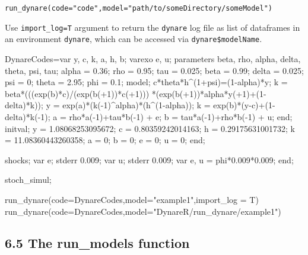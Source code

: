 \documentclass[
  letterpaper,
  DIV=11,
  numbers=noendperiod]{scrartcl}
\newenvironment{Shaded}{\begin{snugshade}}{\end{snugshade}}
\newcommand{\AttributeTok}[1]{\textcolor[rgb]{0.40,0.45,0.13}{#1}}
\newcommand{\FunctionTok}[1]{\textcolor[rgb]{0.28,0.35,0.67}{#1}}
\newcommand{\NormalTok}[1]{\textcolor[rgb]{0.00,0.23,0.31}{#1}}
\newcommand{\OtherTok}[1]{\textcolor[rgb]{0.00,0.23,0.31}{#1}}
\newcommand{\StringTok}[1]{\textcolor[rgb]{0.13,0.47,0.30}{#1}}
\begin{document}
\texttt{run\_dynare(code="code",model="path/to/someDirectory/someModel")}

Use \texttt{import\_log=T} argument to return the \texttt{dynare} log
file as list of dataframes in an environment \texttt{dynare}, which can
be accessed via \texttt{dynare\$modelName}.

\begin{Shaded}
\begin{Highlighting}[]
\NormalTok{DynareCodes}\OtherTok{=}\StringTok{\textquotesingle{}var y, c, k, a, h, b;}
\StringTok{varexo e, u;}
\StringTok{parameters beta, rho, alpha, delta, theta, psi, tau;}
\StringTok{alpha = 0.36;}
\StringTok{rho   = 0.95;}
\StringTok{tau   = 0.025;}
\StringTok{beta  = 0.99;}
\StringTok{delta = 0.025;}
\StringTok{psi   = 0;}
\StringTok{theta = 2.95;}
\StringTok{phi   = 0.1;}
\StringTok{model;}
\StringTok{c*theta*h\^{}(1+psi)=(1{-}alpha)*y;}
\StringTok{k = beta*(((exp(b)*c)/(exp(b(+1))*c(+1)))}
\StringTok{          *(exp(b(+1))*alpha*y(+1)+(1{-}delta)*k));}
\StringTok{y = exp(a)*(k({-}1)\^{}alpha)*(h\^{}(1{-}alpha));}
\StringTok{k = exp(b)*(y{-}c)+(1{-}delta)*k({-}1);}
\StringTok{a = rho*a({-}1)+tau*b({-}1) + e;}
\StringTok{b = tau*a({-}1)+rho*b({-}1) + u;}
\StringTok{end;}
\StringTok{initval;}
\StringTok{y = 1.08068253095672;}
\StringTok{c = 0.80359242014163;}
\StringTok{h = 0.29175631001732;}
\StringTok{k = 11.08360443260358;}
\StringTok{a = 0;}
\StringTok{b = 0;}
\StringTok{e = 0;}
\StringTok{u = 0;}
\StringTok{end;}

\StringTok{shocks;}
\StringTok{var e; stderr 0.009;}
\StringTok{var u; stderr 0.009;}
\StringTok{var e, u = phi*0.009*0.009;}
\StringTok{end;}

\StringTok{stoch\_simul;\textquotesingle{}}

\FunctionTok{run\_dynare}\NormalTok{(}\AttributeTok{code=}\NormalTok{DynareCodes,}\AttributeTok{model=}\StringTok{"example1"}\NormalTok{,}\AttributeTok{import\_log =}\NormalTok{ T)}
\FunctionTok{run\_dynare}\NormalTok{(}\AttributeTok{code=}\NormalTok{DynareCodes,}\AttributeTok{model=}\StringTok{"DynareR/run\_dynare/example1"}\NormalTok{)}
\end{Highlighting}
\end{Shaded}

\hypertarget{the-run_models-function}{%
\subsection{6.5 The run\_models
function}\label{the-run_models-function}}
\end{document}
